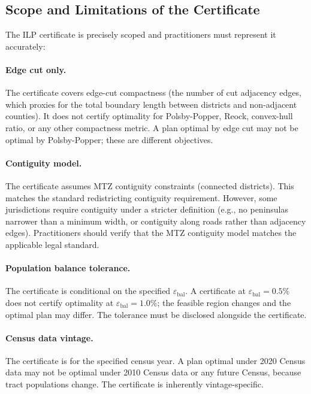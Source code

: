 \subsection{Scope and Limitations of the Certificate}

The ILP certificate is precisely scoped and practitioners must represent
it accurately:

\paragraph{Edge cut only.}
The certificate covers edge-cut compactness (the number of cut adjacency
edges, which proxies for the total boundary length between districts and
non-adjacent counties).
It does not certify optimality for Polsby-Popper, Reock, convex-hull ratio,
or any other compactness metric.
A plan optimal by edge cut may not be optimal by Polsby-Popper; these are
different objectives.

\paragraph{Contiguity model.}
The certificate assumes MTZ contiguity constraints (connected districts).
This matches the standard redistricting contiguity requirement.
However, some jurisdictions require contiguity under a stricter definition
(e.g., no peninsulas narrower than a minimum width, or contiguity along
roads rather than adjacency edges).
Practitioners should verify that the MTZ contiguity model matches the
applicable legal standard.

\paragraph{Population balance tolerance.}
The certificate is conditional on the specified $\varepsilon_{\mathrm{bal}}$.
A certificate at $\varepsilon_{\mathrm{bal}} = 0.5\%$ does not certify
optimality at $\varepsilon_{\mathrm{bal}} = 1.0\%$; the feasible region
changes and the optimal plan may differ.
The tolerance must be disclosed alongside the certificate.

\paragraph{Census data vintage.}
The certificate is for the specified census year.
A plan optimal under 2020 Census data may not be optimal under 2010 Census
data or any future Census, because tract populations change.
The certificate is inherently vintage-specific.

